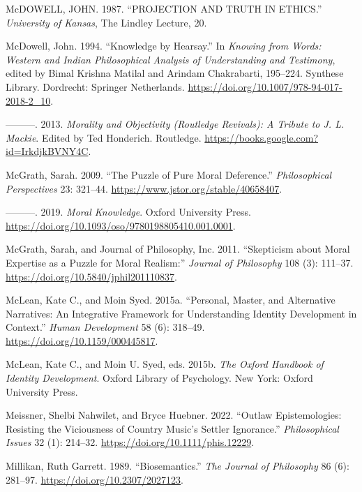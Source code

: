 \documentclass[12pt]{book}
\newenvironment{CSLReferences}%
  {\setlength{\parindent}{0pt}%
   \setlength{\leftskip}{0pt}%
   \setlength{\parskip}{0pt}}%
  {\par}
\theoremstyle{definition}
\theoremstyle{remark}
\begin{document}
\begin{CSLReferences}{1}{0}
McDOWELL, JOHN. 1987. {``{PROJECTION AND TRUTH IN ETHICS}.''} \emph{University of Kansas}, The {Lindley Lecture}, 20.

McDowell, John. 1994. {``Knowledge by {Hearsay}.''} In \emph{Knowing from {Words}: {Western} and {Indian Philosophical Analysis} of {Understanding} and {Testimony}}, edited by Bimal Krishna Matilal and Arindam Chakrabarti, 195--224. Synthese {Library}. Dordrecht: Springer Netherlands. \url{https://doi.org/10.1007/978-94-017-2018-2_10}.

---------. 2013. \emph{Morality and {Objectivity} ({Routledge Revivals}): {A Tribute} to {J}. {L}. {Mackie}}. Edited by Ted Honderich. Routledge. \url{https://books.google.com?id=IrkdjkBVNY4C}.

McGrath, Sarah. 2009. {``The {Puzzle} of {Pure Moral Deference}.''} \emph{Philosophical Perspectives} 23: 321--44. \url{https://www.jstor.org/stable/40658407}.

---------. 2019. \emph{Moral {Knowledge}}. Oxford University Press. \url{https://doi.org/10.1093/oso/9780198805410.001.0001}.

McGrath, Sarah, and Journal of Philosophy, Inc. 2011. {``Skepticism about {Moral Expertise} as a {Puzzle} for {Moral Realism}:''} \emph{Journal of Philosophy} 108 (3): 111--37. \url{https://doi.org/10.5840/jphil201110837}.

McLean, Kate C., and Moin Syed. 2015a. {``Personal, {Master}, and {Alternative Narratives}: {An Integrative Framework} for {Understanding Identity Development} in {Context}.''} \emph{Human Development} 58 (6): 318--49. \url{https://doi.org/10.1159/000445817}.

McLean, Kate C., and Moin U. Syed, eds. 2015b. \emph{The {Oxford} Handbook of Identity Development}. Oxford Library of Psychology. New York: Oxford University Press.

Meissner, Shelbi Nahwilet, and Bryce Huebner. 2022. {``Outlaw Epistemologies: {Resisting} the Viciousness of Country Music's Settler Ignorance.''} \emph{Philosophical Issues} 32 (1): 214--32. \url{https://doi.org/10.1111/phis.12229}.

Millikan, Ruth Garrett. 1989. {``Biosemantics.''} \emph{The Journal of Philosophy} 86 (6): 281--97. \url{https://doi.org/10.2307/2027123}.


\end{CSLReferences}
\end{document}
